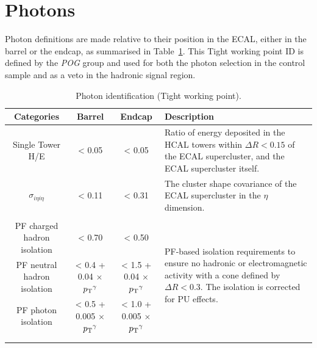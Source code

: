 \section{Photons}  %
\label{sec:objects_photons}

Photon definitions are made relative to their position in the ECAL,
either
in the barrel or the endcap, as summarised in Table~\ref{tab:photon-id-egamma}. 
This Tight working point ID is defined by the \emph{POG} group
\cite{ref:photonidtwiki} and used for both the photon
selection in the \gj control sample and as a veto in the hadronic signal region.

\begin{table}[t]
  \caption{Photon identification (Tight working point).\label{tab:photon-id-egamma}}
  \centering
  \scriptsize
  \begin{tabular}{ cccp{4.2cm} }
    \hline
    \hline
    Categories                    & Barrel                             & Endcap
    & Description                         \\
    \hline
    Single Tower H/E              & < 0.05                               & < 0.05                               
    & Ratio of energy deposited in the HCAL towers within $\Delta R<0.15$ of the ECAL 
    supercluster, and the ECAL supercluster itself. \\
    $\sigma_{i\eta i\eta}$        & < 0.11                               & < 0.31 & 
    The cluster shape covariance of the ECAL supercluster in the $\eta$
    dimension. \\
    &&&\multirow{4}{4.4cm}{PF-based isolation requirements to ensure no hadronic
    or electromagnetic 
    activity with a cone defined by $\Delta R < 0.3$. The isolation is
    corrected for PU effects.}\\
    PF charged hadron isolation   & < 0.70                               & < 0.50                               & \\
    PF neutral hadron isolation   & < 0.4 + 0.04 $\times$ ${p_{\text T}}^{\gamma}$  & < 1.5 + 0.04 $\times$ ${p_{\text T}}^{\gamma}$&
    \\
    PF photon isolation           & < 0.5 + 0.005 $\times$ ${p_{\text T}}^{\gamma}$ & < 1.0 + 0.005 $\times$ ${p_{\text T}}^{\gamma}$& \\
    \\
    \\
    \hline
    \hline
  \end{tabular}
\end{table}

